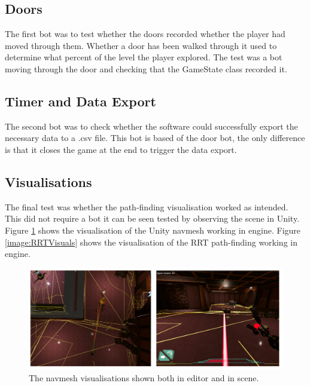 \documentclass[journal]{IEEEtran}
\begin{document}

\subsection{Doors}
The first bot was to test whether the doors recorded whether the player had moved through them. Whether a door has been walked through it used to determine what percent of the level the player explored.
The test was a bot moving through the door and checking that the GameState class recorded it.


\subsection{Timer and Data Export}
The second bot was to check whether the software could successfully export the necessary data to a .csv file. This bot is based of the door bot, the only difference is that it closes the game at the end to trigger the data export.  


\subsection{Visualisations}
The final test was whether the path-finding visualisation worked as intended. This did not require a bot it can be seen tested by observing the scene in Unity. Figure \ref{image:navmeshVisuals} shows the visualisation of the Unity navmesh working in engine.  Figure \ref{image:RRTVisuals} shows the visualisation of the RRT path-finding working in engine.

\begin{figure}[h]
	\includegraphics[width=1.0\linewidth]{NavmeshVis.png}
	\caption{The navmesh visualisations shown both in editor and in scene.}
	\label{image:navmeshVisuals}
\end{figure}  
\end{document}
